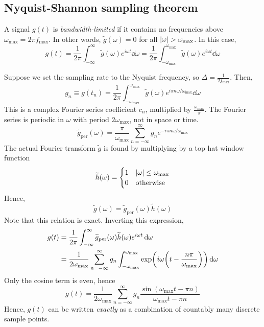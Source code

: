 \subsection{Nyquist-Shannon sampling theorem}
\begin{definition}
	A signal \( g(t) \) is \textit{bandwidth-limited} if it contains no frequencies above \( \omega_{\max} = 2\pi f_{\max} \).
	In other words, \( \widetilde g(\omega) = 0 \) for all \( \abs{\omega} > \omega_{\max} \).
	In this case,
	\[
		g(t) = \frac{1}{2\pi} \int_{-\infty}^\infty \widetilde g(\omega) e^{i\omega t} \dd{\omega} = \frac{1}{2\pi} \int_{-\omega_{\max}}^{\omega_{\max}} \widetilde g(\omega) e^{i\omega t} \dd{\omega}
	\]
\end{definition}
Suppose we set the sampling rate to the Nyquist frequency, so \( \Delta = \frac{1}{2f_{\max}} \).
Then,
\[
	g_n \equiv g(t_n) = \frac{1}{2\pi} \int_{-\omega_{\max}}^{\omega_{\max}} \widetilde g(\omega) e^{i\pi n \omega / \omega_{\max}} \dd{\omega}
\]
This is a complex Fourier series coefficient \( c_n \), multiplied by \( \frac{\omega_{\max}}{\pi} \).
The Fourier series is periodic in \( \omega \) with period \( 2 \omega_{\max} \), not in space or time.
\[
	\widetilde g_\mathrm{per}(\omega) = \frac{\pi}{\omega_{\max}} \sum_{n=-\infty}^\infty g_n e^{-i \pi n \omega / \omega_{\max}}
\]
The actual Fourier transform \( \widetilde g \) is found by multiplying by a top hat window function
\[
	\widetilde h(\omega) = \begin{cases}
		1 & \abs{\omega} \leq \omega_{\max} \\
		0 & \text{otherwise}
	\end{cases}
\]
Hence,
\[
	\widetilde g(\omega) = \widetilde g_\mathrm{per}(\omega) \widetilde h(\omega)
\]
Note that this relation is exact.
Inverting this expression,
\begin{align*}
	g(t) & = \frac{1}{2\pi} \int_{-\infty}^\infty \widetilde g_\mathrm{per}(\omega) \widetilde h(\omega) e^{i \omega t} \dd{\omega}                                     \\
	     & = \frac{1}{2\omega_{\max}} \sum_{n=-\infty}^\infty g_n \int_{-\omega_{\max}}^{\omega_{\max}} \exp(i \omega\qty(t - \frac{n \pi}{\omega_{\max}})) \dd{\omega}
\end{align*}
Only the cosine term is even, hence
\[
	g(t) = \frac{1}{2\omega_{\max}} \sum_{n=-\infty}^\infty g_n \frac{\sin(\omega_{\max} t - \pi n)}{\omega_{\max} t - \pi n}
\]
Hence, \( g(t) \) can be written \textit{exactly} as a combination of countably many discrete sample points.

